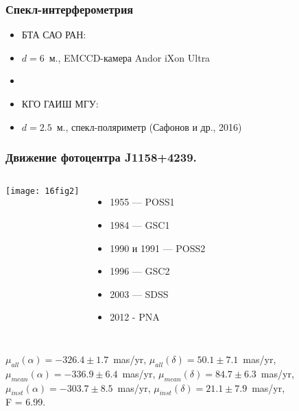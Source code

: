 
\begin{frame}
\frametitle{Спекл-интерферометрия}
\begin{itemize}
\item[] БТА САО РАН:
\item[] $d=6$~м., EMCCD-камера Andor iXon Ultra
\item[]
\item[] КГО ГАИШ МГУ:
\item[] $d=2.5$~м., спекл-поляриметр (Сафонов и др., 2016)
\end{itemize}
\end{frame}

\begin{frame}
\frametitle{Движение фотоцентра J1158+4239.}
\begin{columns}
	\begin{center}
	\texttt{[image: 16fig2]}
	\end{center}
	{\scriptsize
		\begin{itemize}
		\item[] 1955 --- POSS1
		\item[] 1984 --- GSC1
		\item[] 1990 и 1991 --- POSS2
		\item[] 1996 --- GSC2
		\item[] 2003 --- SDSS
		\item[] 2012 - PNA
		\end{itemize}
	}
\end{columns}
\begin{center}
{\scriptsize $\mu_{all}(\alpha)=-326.4\pm 1.7$~mas/yr, $\mu_{all}(\delta)=50.1\pm 7.1$~mas/yr, $\mu_{mean}(\alpha)=-336.9\pm 6.4$~mas/yr, $\mu_{mean}(\delta)=84.7\pm 6.3$~mas/yr, $\mu_{inst}(\alpha)=-303.7\pm 8.5$~mas/yr, $\mu_{inst}(\delta)=21.1\pm 7.9$~mas/yr,\\ F = 6.99.}
\end{center}
\end{frame}

